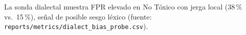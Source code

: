   \item La sonda dialectal muestra FPR elevado en No Tóxico con jerga local (38\,\% vs.\ 15\,\%), señal de posible sesgo léxico (fuente: \texttt{reports/metrics/dialect\_bias\_probe.csv}).

